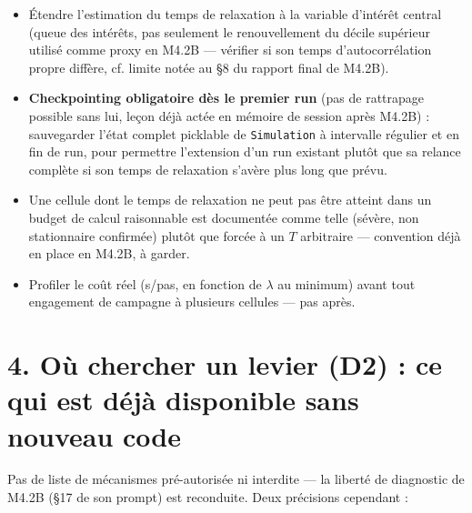 \documentclass[11pt,a4paper]{article}
\newcommand{\code}[1]{\texttt{#1}}
\begin{document}
\begin{itemize}
\item Étendre l'estimation du temps de relaxation à la variable
  d'intérêt central (queue des intérêts, pas seulement le
  renouvellement du décile supérieur utilisé comme proxy en M4.2B ---
  vérifier si son temps d'autocorrélation propre diffère, cf. limite
  notée au \S8 du rapport final de M4.2B).
\item \textbf{Checkpointing obligatoire dès le premier run} (pas de
  rattrapage possible sans lui, leçon déjà actée en mémoire de session
  après M4.2B) : sauvegarder l'état complet picklable de
  \code{Simulation} à intervalle régulier et en fin de run, pour
  permettre l'extension d'un run existant plutôt que sa relance
  complète si son temps de relaxation s'avère plus long que prévu.
\item Une cellule dont le temps de relaxation ne peut pas être atteint
  dans un budget de calcul raisonnable est documentée comme telle
  (sévère, non stationnaire confirmée) plutôt que forcée à un $T$
  arbitraire --- convention déjà en place en M4.2B, à garder.
\item Profiler le coût réel (s/pas, en fonction de $\lambda$ au
  minimum) avant tout engagement de campagne à plusieurs cellules ---
  pas après.
\end{itemize}

\section*{4. Où chercher un levier (D2) : ce qui est déjà disponible sans nouveau code}

Pas de liste de mécanismes pré-autorisée ni interdite --- la liberté
de diagnostic de M4.2B (\S17 de son prompt) est reconduite. Deux
précisions cependant :
\end{document}
